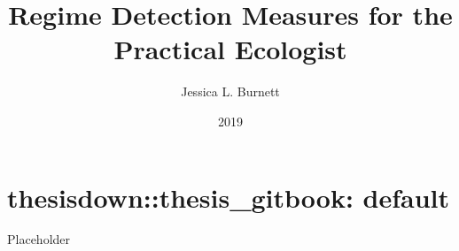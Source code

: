 \documentclass[12pt,twoside,openany]{reedthesis}
\title{Regime Detection Measures for the Practical Ecologist}
\author{Jessica L. Burnett}
\date{2019}
\begin{document}
  \maketitle

\frontmatter %
\pagestyle{empty} %

%

  \hypersetup{linkcolor=black}
  \setcounter{tocdepth}{2}
  \tableofcontents

  \listoftables

  \listoffigures


%
\mainmatter %
\pagestyle{fancyplain} %
\doublespacing{} %

\chapter{thesisdown::thesis\_gitbook:
default}\label{thesisdownthesis_gitbook-default}

Placeholder
\end{document}
